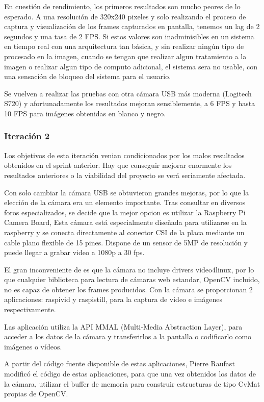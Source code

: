 En cuestión de rendimiento, los primeros resultados son mucho peores de lo esperado. A una resolución de 320x240 pixeles y solo realizando el proceso de captura y visualización de los frames capturados en pantalla, tenemos un lag de 2 segundos y una tasa de 2 FPS. Si estos valores son inadminisibles en un sistema en tiempo real con una arquitectura tan básica, y sin realizar ningún tipo de procesado en la imagen, cuando se tengan que realizar algun tratamiento a la imagen o realizar algun tipo de computo adicional, el sistema sera no usable, con una sensación de bloqueo del sistema para el usuario.   

Se vuelven a realizar las pruebas con otra cámara USB más moderna (Logitech S720) y afortunadamente los resultados mejoran sensiblemente, a 6 FPS y hasta 10 FPS para imágenes obtenidas en blanco y negro.  


\subsubsection{Iteración 2}
Los objetivos de esta iteración venian condicionados por los malos resultados obtenidos en el sprint anterior. Hay que conseguir mejorar enormente los resultados anteriores o la viabilidad del proyecto se verá seriamente afectada.

Con solo cambiar la cámara USB se obtuvieron grandes mejoras, por lo que la elección de la cámara era un elemento importante. Tras consultar en diversos foros especializados, se decide que la mejor opcion es utilizar la Raspberry Pi Camera Board, Esta cámara está especialmente diseñada para utilizarse en la raspberry y se conecta directamente al conector CSI de la placa mediante un cable plano flexible de 15 pines. Dispone de un sensor de 5MP de resolución y  puede llegar a grabar video a 1080p a 30 fps.

El gran inconveniente de es que la cámara no incluye drivers video4linux, por lo que cualquier biblioteca para lectura de cámaras web estandar, OpenCV incluido, no es capaz de obtener los frames producidos. Con la cámara se proporcionan 2 aplicaciones: raspivid y raspistill, para la captura de video e imágenes respectivamente.

Las aplicación utiliza la API MMAL (Multi-Media Abstraction Layer), para acceder a los datos de la cámara y transferirlos a la pantalla o codificarlo como imágenes o vídeos.

A partir del código fuente disponible de estas aplicaciones, Pierre Raufast modificó el código de estas aplicaciones, para que una vez obtenidos los datos de la cámara, utilizar el buffer de memoria para construir estructuras de tipo CvMat propias de OpenCV.

